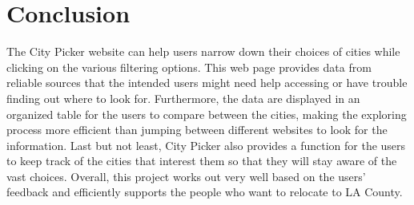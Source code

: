 \documentclass[10pt,twocolumn]{article}
\begin{document}
\section{Conclusion}
The City Picker website can help users narrow down their choices of cities while clicking on the various filtering options. This web page provides data from reliable sources that the intended users might need help accessing or have trouble finding out where to look for. Furthermore, the data are displayed in an organized table for the users to compare between the cities, making the exploring process more efficient than jumping between different websites to look for the information. Last but not least, City Picker also provides a function for the users to keep track of the cities that interest them so that they will stay aware of the vast choices. Overall, this project works out very well based on the users' feedback and efficiently supports the people who want to relocate to LA County.

\printbibliography
\end{document}
